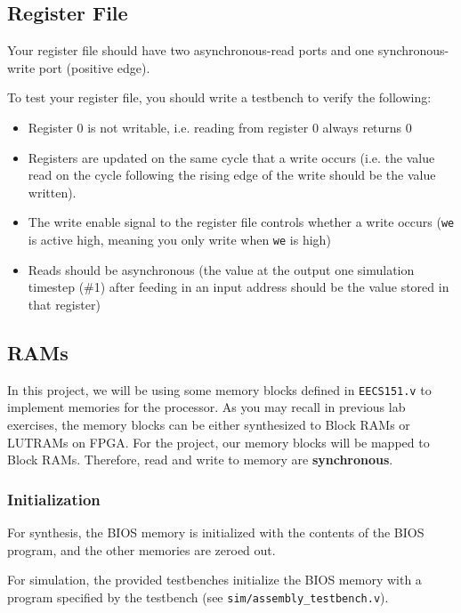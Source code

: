 \documentclass[11pt]{article}
\begin{document}
\subsection{Register File}
\label{reg_file}
Your register file should have two asynchronous-read ports and one synchronous-write port (positive edge).

To test your register file, you should write a testbench to verify the following:
\begin{itemize}
  \item Register 0 is not writable, i.e. reading from register 0 always returns 0
  \item Registers are updated on the same cycle that a write occurs (i.e. the value read on the cycle following the rising edge of the write should be the value written).
  \item The write enable signal to the register file controls whether a write occurs (\verb|we| is active high, meaning you only write when \verb|we| is high)
  \item Reads should be asynchronous (the value at the output one simulation timestep (\#1) after feeding in an input address should be the value stored in that register)
\end{itemize}

\subsection{RAMs}
\label{ram_info}
In this project, we will be using some memory blocks defined in \verb|EECS151.v| to implement memories for the processor.
As you may recall in previous lab exercises, the memory blocks can be either synthesized to Block RAMs or LUTRAMs on FPGA.
For the project, our memory blocks will be mapped to Block RAMs. Therefore, read and write to memory are \textbf{synchronous}.

\subsubsection{Initialization}

For synthesis, the BIOS memory is initialized with the contents of the BIOS program, and the other memories are zeroed out.

For simulation, the provided testbenches initialize the BIOS memory with a program specified by the testbench (see \verb|sim/assembly_testbench.v|).
\end{document}
